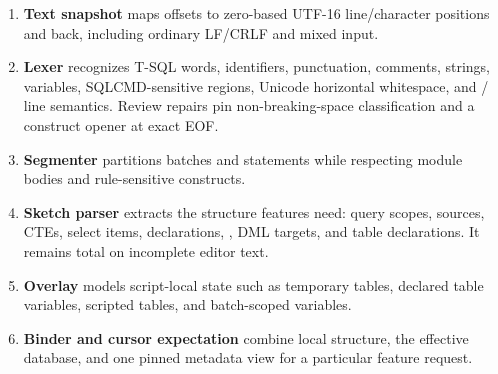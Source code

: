 \documentclass[11pt]{article}
\newcommand{\code}[1]{\texttt{\detokenize{#1}}}
\begin{document}
\begin{enumerate}
  \item \textbf{Text snapshot} maps offsets to zero-based UTF-16 line/character positions and back, including ordinary LF/CRLF and mixed input.
  \item \textbf{Lexer} recognizes T-SQL words, identifiers, punctuation, comments, strings, variables, SQLCMD-sensitive regions, Unicode horizontal whitespace, and \code{GO} / \code{GO n} line semantics. Review repairs pin non-breaking-space classification and a construct opener at exact EOF.
  \item \textbf{Segmenter} partitions batches and statements while respecting module bodies and rule-sensitive constructs.
  \item \textbf{Sketch parser} extracts the structure features need: query scopes, sources, CTEs, select items, declarations, \code{EXEC}, DML targets, and table declarations. It remains total on incomplete editor text.
  \item \textbf{Overlay} models script-local state such as temporary tables, declared table variables, scripted tables, and batch-scoped variables.
  \item \textbf{Binder and cursor expectation} combine local structure, the effective database, and one pinned metadata view for a particular feature request.
\end{enumerate}
\end{document}
